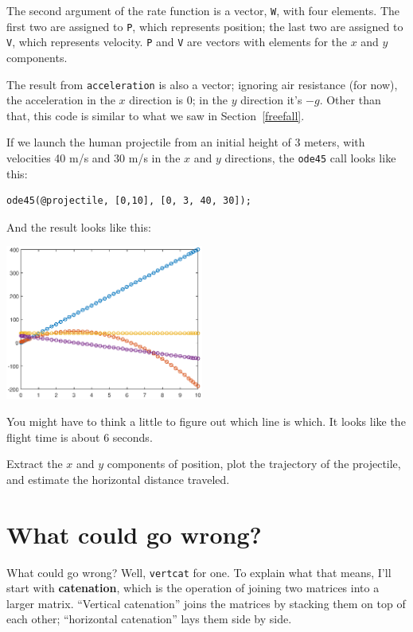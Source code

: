 \documentclass{book}
\begin{document}
The second argument of the rate function is a vector, {\tt W}, with
four elements.  The first two are assigned to {\tt P}, which
represents position; the last two are assigned to {\tt V}, which
represents velocity.
{\tt P} and {\tt V} are vectors with
elements for the $x$ and $y$ components.

The result from
{\tt acceleration} is also a vector; ignoring air resistance
(for now), the acceleration in the $x$ direction is 0; in
the $y$ direction it's $-g$.
Other than that, this code is similar to what we saw in
Section~\ref{freefall}.

If we launch the human projectile from an initial height of
3 meters, with velocities 40 m/s and 30 m/s in the $x$ and $y$
directions, the {\tt ode45} call looks like
this:

\begin{verbatim}
ode45(@projectile, [0,10], [0, 3, 40, 30]);
\end{verbatim}

And the result looks like this:

\beforefig \centerline{\includegraphics[height=2in]{figs/proj1_10s.eps}}

You might have to think a little to figure out which line is
which.  It looks like the flight time is about 6 seconds.

\begin{ex}
Extract the $x$ and $y$ components of
position, plot the trajectory of the projectile, and estimate the
horizontal distance traveled.
\end{ex}


\section{What could go wrong?}

What could go wrong?  Well, {\tt vertcat} for one.  To explain
what that means, I'll start with {\bf catenation}, which is
the operation of joining two matrices into a larger matrix.
``Vertical catenation'' joins the matrices by stacking them on
top of each other; ``horizontal catenation'' lays them
side by side.
\end{document}
